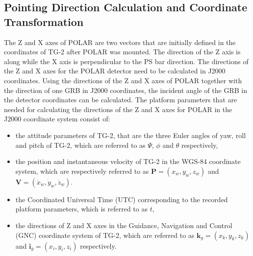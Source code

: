 \documentclass{raa}
\begin{document}
\subsection{Pointing Direction Calculation and Coordinate Transformation} \label{sec:coo_trans}
The Z and X axes of POLAR are two vectors that are initially defined in the coordinates of TG-2 after POLAR was mounted. The direction of the Z axis is along while the X axis is perpendicular to the PS bar direction. The directions of the Z and X axes for the POLAR detector need to be calculated in J2000 coordinates. Using the directions of the Z and X axes of POLAR together with the direction of one GRB in J2000 coordinates, the incident angle of the GRB in the detector coordinates can be calculated. The platform parameters that are needed for calculating the directions of the Z and X axes for POLAR in the J2000 coordinate system consist of:
\begin{itemize}
\item the attitude parameters of TG-2, that are the three Euler angles of yaw, roll and pitch of TG-2, which are referred to as $\Psi$, $\phi$ and $\theta$ respectively,
\item the position and instantaneous velocity of TG-2 in the WGS-84  coordinate system, which are respectively referred to as $\bm{P} = (x_w, y_w, z_w)$ and $\bm{V} = (\dot{x}_w, \dot{y}_w, \dot{z}_w)$.
\item the Coordinated Universal Time (UTC) corresponding to the recorded platform parameters, which is referred to as $t$,
\item the directions of Z and X axes in the Guidance, Navigation and Control (GNC) coordinate system of TG-2, which are referred to as $\bm{k}_g = (x_{k}, y_{k}, z_{k})$ and $\bm{i}_g = (x_i, y_i, z_i)$ respectively.
\end{itemize}
\end{document}
